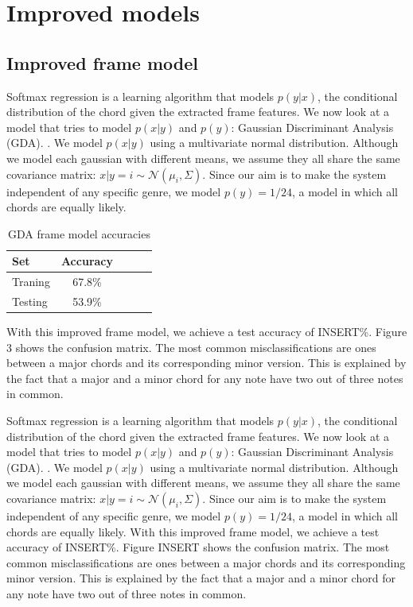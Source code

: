 \documentclass{article}
\begin{document}
\section{Improved models}
\subsection{Improved frame model}

Softmax regression is a learning algorithm that models $p(y|x)$, the conditional
distribution of the chord given the extracted frame features. We now look at a
model that tries to model $p(x|y)$ and $p(y)$: Gaussian Discriminant Analysis
(GDA). \cite{jiang}. We model $p(x|y)$ using a multivariate normal distribution.
Although we model each gaussian with different means, we assume they all share
the same covariance matrix: $x|y=i \sim \mathcal{N}$$(\mu_i, \Sigma)$. Since our
aim is to make the system independent of any specific genre, we model $p(y) =
1/24$, a model in which all chords are equally likely.

\begin{table}[t]
\caption{GDA frame model accuracies}
\label{mfccvschroma}
\vskip 0.15in
\begin{center}
\begin{small}
\begin{sc}
\begin{tabular}{lcccr}
\hline
\abovespace\belowspace
Set & Accuracy \\
\hline
\abovespace
Traning & 67.8\%\\
Testing & 53.9\%\\
\hline
\end{tabular}
\end{sc}
\end{small}
\end{center}
\vskip -0.1in
\end{table}

With this improved frame model, we achieve a test accuracy of INSERT\%. Figure
3 shows the confusion matrix. The most common misclassifications are ones
between a major chords and its corresponding minor version. This is explained by
the fact that a major and a minor chord for any note have two out of three notes
in common.

Softmax regression is a learning algorithm that models $p(y|x)$, the conditional
distribution of the chord given the extracted frame features. We now look at a
model that tries to model $p(x|y)$ and $p(y)$: Gaussian Discriminant Analysis
(GDA). \cite{jiang}. We model $p(x|y)$ using a multivariate normal distribution.
Although we model each gaussian with different means, we assume they all share
the same covariance matrix: $x|y=i \sim \mathcal{N}$$(\mu_i, \Sigma)$. Since our
aim is to make the system independent of any specific genre, we model $p(y) =
1/24$, a model in which all chords are equally likely. With this improved frame
model, we achieve a test accuracy of INSERT\%. Figure INSERT shows the confusion
matrix. The most common misclassifications are ones between a major chords and
its corresponding minor version. This is explained by the fact that a major and
a minor chord for any note have two out of three notes in common.
\end{document}
